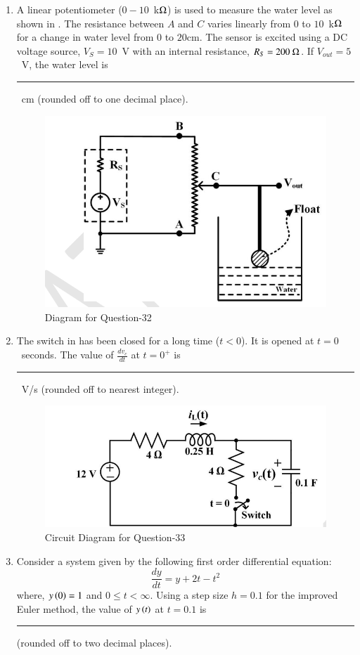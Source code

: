 \documentclass[journal,12pt,onecolumn]{IEEEtran}
\theoremstyle{remark}
\begin{document}
\begin{enumerate}
\item A linear potentiometer ($0-10$~k$\ohm$) is used to measure the water level as shown in . The resistance between $A$ and $C$ varies linearly from $0$ to $10$~k$\ohm$ for a change in water level from $0$ to $20$cm. The sensor is excited using a DC voltage source, $V_S = 10$~V with an internal resistance, $R_S = 200~\ohm$. If $V_{out} = 5$~V, the water level is \rule{1.5cm}{0.4pt}~cm (rounded off to one decimal place).
\par\hfill{}
\begin{figure}[H]
    \centering
    \includegraphics[width=0.4\columnwidth]{Figs/Q-32.png}
    \caption{Diagram for Question-32}
    \label{32}
\end{figure}

\item The switch in  has been closed for a long time ($t<0$). It is opened at $t=0$~seconds. The value of $\frac{d v_c}{dt}$ at $t=0^+$ is \rule{1.5cm}{0.4pt}~V/s (rounded off to nearest integer).
\par\hfill{}
\begin{figure}[H]
    \centering
    \includegraphics[width=0.5\columnwidth]{Figs/Q-33.png}
    \caption{Circuit Diagram for Question-33}
    \label{33}
\end{figure}

\item Consider a system given by the following first order differential equation:
$$\frac{dy}{dt} = y + 2t - t^2$$
where, $y\brak{0}=1$ and $0\leq t < \infty$. Using a step size $h=0.1$ for the improved Euler method, the value of $y\brak{t}$ at $t=0.1$ is \rule{1.5cm}{0.4pt} (rounded off to two decimal places).
\par\hfill{}


\end{enumerate}
\end{document}
